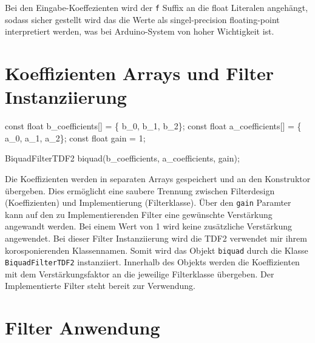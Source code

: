 \documentclass[
  ngerman,
  letterpaper,
  DIV=11]{scrreprt}
\newenvironment{Shaded}{\begin{snugshade}}{\end{snugshade}}
\newcommand{\AttributeTok}[1]{\textcolor[rgb]{0.40,0.45,0.13}{#1}}
\newcommand{\DataTypeTok}[1]{\textcolor[rgb]{0.68,0.00,0.00}{#1}}
\newcommand{\DecValTok}[1]{\textcolor[rgb]{0.68,0.00,0.00}{#1}}
\newcommand{\NormalTok}[1]{\textcolor[rgb]{0.00,0.23,0.31}{#1}}
\newcommand{\OperatorTok}[1]{\textcolor[rgb]{0.37,0.37,0.37}{#1}}
\begin{document}
Bei den Eingabe-Koeffezienten wird der \texttt{f} Suffix an die float
Literalen angehängt, sodass sicher gestellt wird das die Werte als
singel-precision floating-point interpretiert werden, was bei
Arduino-System von hoher Wichtigkeit ist.

\section{Koeffizienten Arrays und Filter
Instanziierung}\label{koeffizienten-arrays-und-filter-instanziierung}

\begin{Shaded}
\begin{Highlighting}[]
\AttributeTok{const} \DataTypeTok{float}\NormalTok{ b\_coefficients}\OperatorTok{[]} \OperatorTok{=} \OperatorTok{\{}\NormalTok{ b\_0}\OperatorTok{,}\NormalTok{ b\_1}\OperatorTok{,}\NormalTok{ b\_2}\OperatorTok{\};}
\AttributeTok{const} \DataTypeTok{float}\NormalTok{ a\_coefficients}\OperatorTok{[]} \OperatorTok{=} \OperatorTok{\{}\NormalTok{ a\_0}\OperatorTok{,}\NormalTok{ a\_1}\OperatorTok{,}\NormalTok{ a\_2}\OperatorTok{\};}
\AttributeTok{const} \DataTypeTok{float}\NormalTok{ gain }\OperatorTok{=} \DecValTok{1}\OperatorTok{;}

\NormalTok{BiquadFilterTDF2 biquad}\OperatorTok{(}\NormalTok{b\_coefficients}\OperatorTok{,}\NormalTok{ a\_coefficients}\OperatorTok{,}\NormalTok{ gain}\OperatorTok{);}
\end{Highlighting}
\end{Shaded}

Die Koeffizienten werden in separaten Arrays gespeichert und an den
Konstruktor übergeben. Dies ermöglicht eine saubere Trennung zwischen
Filterdesign (Koeffizienten) und Implementierung (Filterklasse). Über
den \texttt{gain} Paramter kann auf den zu Implementierenden Filter eine
gewünschte Verstärkung angewandt werden. Bei einem Wert von 1 wird keine
zusätzliche Verstärkung angewendet. Bei dieser Filter Instanziierung
wird die TDF2 verwendet mir ihrem korosponierenden Klassennamen. Somit
wird das Objekt \texttt{biquad} durch die Klasse
\texttt{BiquadFilterTDF2} instanziiert. Innerhalb des Objekts werden die
Koeffizienten mit dem Verstärkungsfaktor an die jeweilige Filterklasse
übergeben. Der Implementierte Filter steht bereit zur Verwendung.

\section{Filter Anwendung}\label{filter-anwendung}
\end{document}
